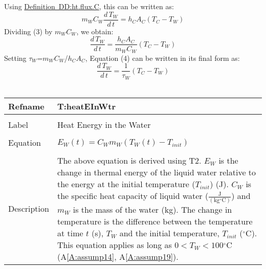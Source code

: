 \documentclass[12pt]{article}
\begin{document}
Using \hyperref[DD:ht.flux.C]{Definition~DD:ht.flux.C}, this can be written as:
\begin{dmath}
{m_{W}} {C_{W}} \frac{d\,{T_{W}}}{d\,t}={h_{C}} {A_{C}} \left({T_{C}}-{T_{W}}\right)
\end{dmath}
Dividing (3) by ${m_{W}}$${C_{W}}$, we obtain:
\begin{dmath}
\frac{d\,{T_{W}}}{d\,t}=\frac{{h_{C}} {A_{C}}}{{m_{W}} {C_{W}}} \left({T_{C}}-{T_{W}}\right)
\end{dmath}
Setting ${\tau{}_{W}}$=${m_{W}}$${C_{W}}$/${h_{C}}$${A_{C}}$, Equation (4) can be written in its final form as:
\begin{dmath}
\frac{d\,{T_{W}}}{d\,t}=\frac{1}{{\tau{}_{W}}} \left({T_{C}}-{T_{W}}\right)
\end{dmath}
~\newline
\noindent \begin{minipage}{\textwidth}
\begin{tabular}{p{} p{}}
\toprule \textbf{Refname} & \textbf{T:heatEInWtr}
\label{T:heatEInWtr}
\\ \midrule \\
Label & Heat Energy in the Water
\\ \midrule \\
Equation & ${E_{W}}\left(t\right)={C_{W}} {m_{W}} \left({T_{W}}\left(t\right)-{T_{init}}\right)$
\\ \midrule \\
Description & The above equation is derived using T2. ${E_{W}}$ is the change in thermal energy of the liquid water relative to the energy at the initial temperature (${T_{init}}$) (J). ${C_{W}}$ is the specific heat capacity of liquid water ($\frac{\text{J}}{(\text{kg}{}^{\circ}\text{C})}$) and ${m_{W}}$ is the mass of the water (kg). The change in temperature is the difference between the temperature at time $t$ (s), ${T_{W}}$ and the initial temperature, ${T_{init}}$ (${}^{\circ}$C). This equation applies as long as $0<{T_{W}}<100$${}^{\circ}$C (A\ref{A:assump14}, A\ref{A:assump19}).
\\ \bottomrule \end{tabular}
\end{minipage}\\
\end{document}
